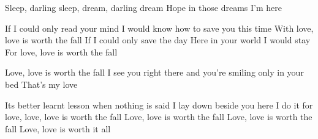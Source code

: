 \documentclass[../../../songbook.tex]{subfiles}
\begin{document}
Sleep, darling sleep, dream, darling dream 			 \newline
Hope in those dreams I’m here	 \newline

\-\hspace{1cm} If I could only read your mind			 \newline
\-\hspace{1cm} I would know how to save you this time 	 \newline
\-\hspace{1cm} With love, love is worth the fall		 \newline
\-\hspace{1cm} If I could only save the day 			 \newline
\-\hspace{1cm} Here in your world I would stay			 \newline
\-\hspace{1cm} For love, love is worth the fall			 \newline
  
\-\hspace{1cm} Love, love is worth the fall									 \newline
\-\hspace{1cm} I see you right there and you’re smiling only in your bed 	 \newline	
\-\hspace{1cm} That’s my love												 \newline

\-\hspace{1cm} Its better learnt lesson when nothing is said	 \newline
\-\hspace{1cm} I lay down beside you here 						 \newline 
\-\hspace{1cm} I do it for love, love, love is worth the fall	 \newline
\-\hspace{1cm} Love, love is worth the fall						 \newline
\-\hspace{1cm} Love, love is worth the fall						 \newline
\-\hspace{1cm} Love, love is worth it all						 \newline
\end{document}
